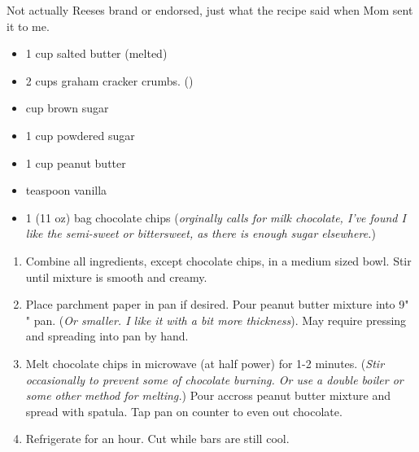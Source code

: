 
\fromMom 
Not actually Reeses brand or endorsed, just what the recipe said when
Mom sent it to me.

\ingredients
\begin{itemize}
    \item 1 cup salted butter (melted)
    \item 2 cups graham cracker crumbs. ()
    \item {} cup brown sugar
    \item 1  cup powdered sugar
    \item 1 cup peanut butter
    \item {} teaspoon vanilla
    \item 1 (11 oz) bag chocolate chips (\textit{orginally calls for milk chocolate, I've found I like the semi-sweet or bittersweet, as there is enough sugar elsewhere.})
\end{itemize}

\instructions
\begin{enumerate}
    \item Combine all ingredients, except chocolate chips, in a medium sized bowl. Stir until mixture is smooth and creamy.
    \item Place parchment paper in pan if desired. Pour peanut butter mixture into 9" " pan. (\textit{Or smaller. I like it with a bit more thickness}). May require pressing and spreading into pan by hand. 
    \item Melt chocolate chips in microwave (at half power) for 1-2 minutes. (\textit{Stir occasionally to prevent some of chocolate burning. Or use a double boiler or some other method for melting.}) Pour accross peanut butter mixture and spread with spatula. Tap pan on counter to even out chocolate.
    \item Refrigerate for an hour. Cut while bars are still cool.
\end{enumerate}